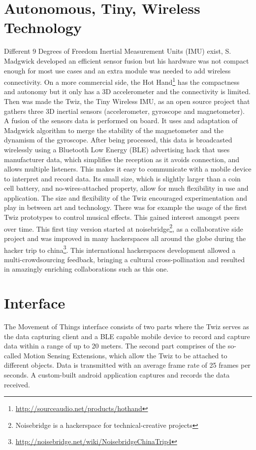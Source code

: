 \documentclass{sigchi}
\begin{document}
\section{Autonomous, Tiny, Wireless Technology}

Different 9 Degrees of Freedom Inertial Measurement Units
(IMU) exist, S. Madgwick\cite {madgwick} developed an
efficient sensor fusion but his hardware was not compact
enough for most use cases and an extra module was needed
to add wireless connectivity.
On a more commercial side, the Hot Hand\footnote
{\url{http://sourceaudio.net/products/hothand}} has the compactness
and autonomy but it only has a 3D accelerometer and the
connectivity is limited.
Then was made the Twiz, the Tiny Wireless IMU, as an open
source project that gathers three 3D inertial sensors
(accelerometer, gyroscope and magnetometer).
A fusion of the sensors data is performed on board.
It uses and adaptation of Madgwick algorithm to
merge the stability of the magnetometer and the
dynamism of the gyroscope. After being processed, this
data is broadcasted wirelessly using a Bluetooth Low
Energy (BLE) advertising hack that uses manufacturer
data, which simplifies the reception as it avoids
connection, and allows multiple listeners. This makes it
easy to communicate with a mobile device to interpret
and record data. Its small size, which is slightly larger
than a coin cell battery, and no-wires-attached
property, allow for much flexibility in use and
application.
The size and flexibility of the Twiz encouraged
experimentation and play in between art and
technology. There was for example the usage of the
first Twiz prototypes to control musical effects. This
gained interest amongst peers over time. This first tiny
version started at noisebridge\footnote{Noisebridge is a
hackerspace for technical-creative projects}, as a collaborative
side project and was improved in many hackerspaces all
around the globe during the hacker trip to china\footnote
{\url{http://noisebridge.net/wiki/NoisebridgeChinaTrip4}}.
This international hackerspaces development allowed a
multi-crowdsourcing feedback, bringing a cultural
cross-pollination and resulted in amazingly enriching
collaborations such as this one.

\section{Interface}

The Movement of Things interface consists of two parts
where the Twiz serves as the data capturing client and a
BLE capable mobile device to record and capture data
within a range of up to 20 meters. The second part
comprises of the so-called Motion Sensing Extensions,
which allow the Twiz to be attached to different objects.
Data is transmitted with an average frame rate of 25
frames per seconds. A custom-built android application
captures and records the data received.
\end{document}
